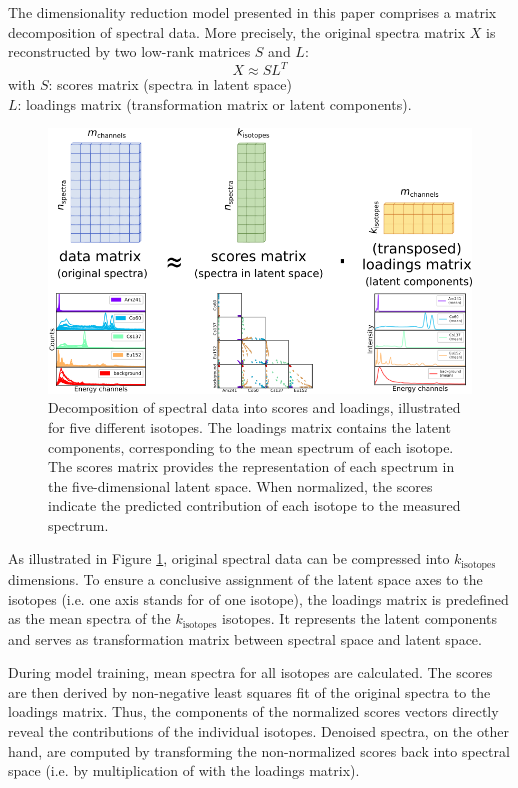 \documentclass[preprint,12pt, a4paper]{elsarticle}
\begin{document}
The dimensionality reduction model presented in this paper comprises a matrix decomposition of spectral data. More precisely, the original spectra matrix $X$ is reconstructed by two low-rank matrices $S$ and $L$:  
$$ X \approx S  L^{T} $$  
with $S$: scores matrix (spectra in latent space) \\  
\hspace*{0.8cm} $L$: loadings matrix (transformation matrix or latent components). \\ 

\begin{figure}
\includegraphics[width=\textwidth]{matrix_decomposition.png}
\caption{Decomposition of spectral data into scores and loadings, illustrated for five different isotopes. The loadings matrix contains the latent components, corresponding to the mean spectrum of each isotope. The scores matrix provides the representation of each spectrum in the five-dimensional latent space. When normalized, the scores indicate the predicted contribution of each isotope to the measured spectrum.}
\label{fig:matrix_decomposition}
\end{figure}

As illustrated in Figure \ref{fig:matrix_decomposition}, original spectral data can be compressed into $k_\mathrm{isotopes}$ dimensions. To ensure a conclusive assignment of the latent space axes to the isotopes (i.e. one axis stands for of one isotope), the loadings matrix is predefined as the mean spectra of the $k_\mathrm{isotopes}$ isotopes. It represents the latent components and serves as transformation matrix between spectral space and latent space.

During model training, mean spectra for all isotopes are calculated. The scores are then derived by non-negative least squares fit of the original spectra to the loadings matrix. Thus, the components of the normalized scores vectors directly reveal the contributions of the individual isotopes. Denoised spectra, on the other hand, are computed by transforming the non-normalized scores back into spectral space (i.e. by multiplication of with the loadings matrix).
\end{document}
